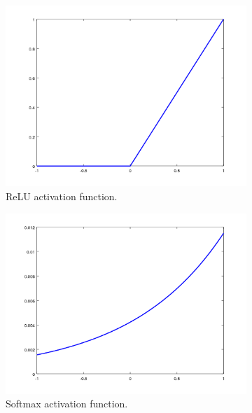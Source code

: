 \begin{description}
	\begin{figure}
		\centering
		\begin{subfigure}{0.5\textwidth}
			\centering
			\includegraphics[width=1\linewidth]{figures/relu.png}
			\caption{ReLU activation function.}\label{fig:relu}
		\end{subfigure}%
		\begin{subfigure}{0.5\textwidth}
			\centering
			\includegraphics[width=1\linewidth]{figures/softmax.png}
			\caption{Softmax activation function.}\label{fig:softmax}
		\end{subfigure}
		\caption[Activation functions.]{}
		\label{fig:activations}
	\end{figure}
	
\end{description}

